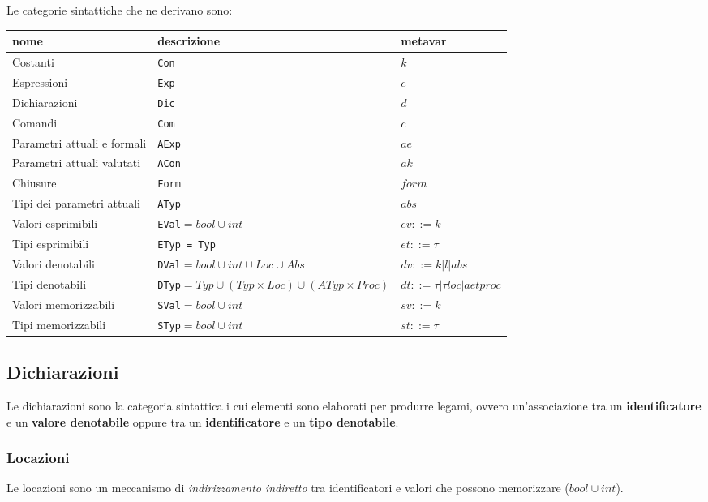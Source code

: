 \documentclass[a4paper, 10pt]{article}
\begin{document}
	\vspace*{0.5cm}
	
	Le categorie sintattiche che ne derivano sono:
	
	\noindent
	\begin{tabular}{lll}
		\toprule
		nome & descrizione & metavar \\
		\midrule
		Costanti &  \lstinline|Con| & $ k $ \\
		Espressioni &  \lstinline|Exp| & $ e $\\
		Dichiarazioni &  \lstinline|Dic| & $ d $ \\
		Comandi &  \lstinline|Com| & $ c $\\
		Parametri attuali e formali &  \lstinline|AExp| & $ ae $\\
		Parametri attuali valutati &  \lstinline|ACon| & $ ak $\\
		Chiusure &  \lstinline|Form| & $ form $\\
		Tipi dei parametri attuali &  \lstinline|ATyp| & $ abs $\\
		Valori esprimibili &  \lstinline|EVal|$= bool \cup int$ & $ ev::= k $\\
		Tipi esprimibili &  \lstinline|ETyp = Typ| & $ et::= \tau $\\
		Valori denotabili &  \lstinline|DVal|$= bool \cup int \cup Loc \cup Abs$ & $ dv::= k | l | abs $\\
		Tipi  denotabili &  \lstinline|DTyp|{\small$= Typ \cup (Typ\times Loc)\cup(ATyp\times Proc)$} & 
		{\small$ dt::= \tau | \tau loc | aetproc $}\\
		Valori memorizzabili &  \lstinline|SVal|$= bool \cup int$ & $ sv::=k $\\
		Tipi memorizzabili &  \lstinline|STyp|$= bool \cup int$ & $ st::=\tau $\\
	\end{tabular}
	
	
	\subsection{Dichiarazioni}
	Le dichiarazioni sono la categoria sintattica i cui elementi sono elaborati per produrre legami, ovvero un'associazione tra un \textbf{identificatore} e un \textbf{valore denotabile} oppure tra un \textbf{identificatore} e un \textbf{tipo denotabile}.
	
	\subsubsection{Locazioni}
	Le locazioni sono un meccanismo di \textit{indirizzamento indiretto} tra identificatori e valori che possono memorizzare ($bool \cup int$).
	
\end{document}
